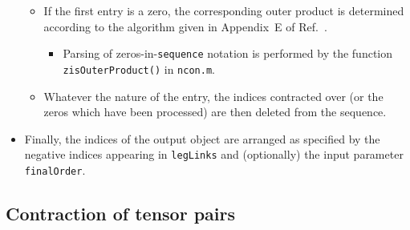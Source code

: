 \documentclass[aps,prb,reprint,superscriptaddress,amsmath,amsfonts]{revtex4-1}
\theoremstyle{definition}
\newcommand{\rcite}[1]{Ref.~\onlinecite{#1}}
\newcommand{\ttt}[1]{\texttt{#1}}
\begin{document}
\begin{itemize}
\begin{itemize}
\begin{itemize}
\end{itemize}
\item If the first entry is a zero, the corresponding outer product is determined according to the algorithm given in Appendix~E of \rcite{pfeifer2013a}.
\begin{itemize}
\item Parsing of zeros-in-\ttt{sequence} notation is performed by the function \ttt{zisOuterProduct()} in \ttt{ncon.m}.
\end{itemize}
\item Whatever the nature of the entry, the indices contracted over (or the zeros which have been processed) are then deleted from the sequence.
\end{itemize}
\item Finally, the indices of the output object are arranged as specified by the negative indices appearing in \ttt{legLinks} and (optionally) the input parameter \ttt{finalOrder}.
\end{itemize}

\subsection{Contraction of tensor pairs\label{sec:suboptimal}}
\end{document}
